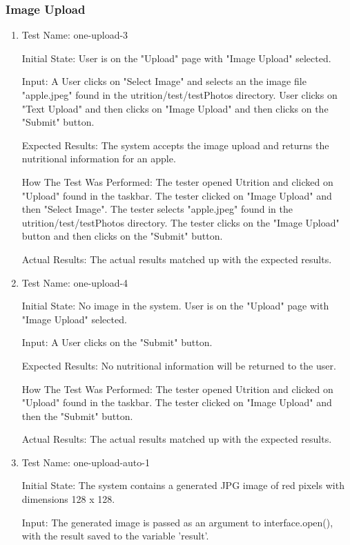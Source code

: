 \documentclass[12pt, titlepage]{article}
\begin{document}
	\subsubsection{Image Upload}
	\begin{enumerate}
		\item{Test Name: one-upload-3}
		
		Initial State: User is on the "Upload" page with "Image Upload" selected.
		
		Input: A User clicks on "Select Image" and selects an the image file "apple.jpeg" found in the utrition/test/testPhotos directory. User clicks on "Text Upload" and then clicks on "Image Upload" and then clicks on the "Submit" button.
		
		Expected Results: The system accepts the image upload and returns the nutritional information for an apple. 
		
		How The Test Was Performed: The tester opened Utrition and clicked on "Upload" found in the taskbar. The tester clicked on "Image Upload" and then "Select Image". The tester selects "apple.jpeg" found in the utrition/test/testPhotos directory. The tester clicks on the "Image Upload" button and then clicks on the "Submit" button.
		
		Actual Results: The actual results matched up with the expected results. 
		
		\item{Test Name: one-upload-4}
		
		Initial State: No image in the system. User is on the "Upload" page with "Image Upload" selected.
		
		Input: A User clicks on the "Submit" button.
		
		Expected Results: No nutritional information will be returned to the user.
		
		How The Test Was Performed: The tester opened Utrition and clicked on "Upload" found in the taskbar. The tester clicked on "Image Upload" and then the "Submit" button.
		
		Actual Results: The actual results matched up with the expected results.

		\item{Test Name: one-upload-auto-1}
		
		Initial State: The system contains a generated JPG image of red pixels with dimensions 128 x 128.
		
		Input: The generated image is passed as an argument to interface.open(), with the result saved to the variable 'result'.
		

\end{enumerate}
\end{document}
